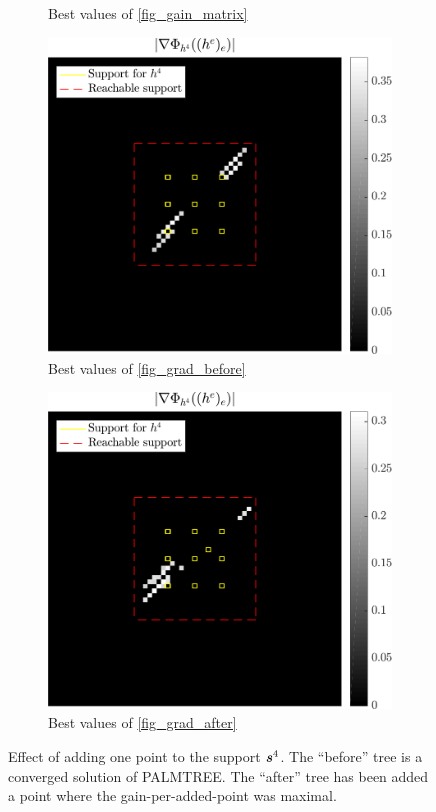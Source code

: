 \begin{figure}[!ht]
\begin{subfigure}[b]{0.32\linewidth}
\caption{Best values of \ref{fig_gain_matrix}}
\end{subfigure}
\begin{subfigure}[b]{0.32\linewidth}\centering
\includegraphics[width=\linewidth]{figures/before_after/xp_128x128_sc2_angl1_K3_S3_node4before_partgrad4_bestvalues.pdf}
\caption{Best values of \ref{fig_grad_before}}
\end{subfigure}
\begin{subfigure}[b]{0.32\linewidth}\centering
\includegraphics[width=\linewidth]{figures/before_after/xp_128x128_sc2_angl1_K3_S3_node4after_partgrad4_bestvalues.pdf}
\caption{Best values of \ref{fig_grad_after}}
\end{subfigure}
\caption{Effect of adding one point to the support $\bm{s}^4$. The “before” tree is a converged solution of \ac{PALMTREE}. The “after” tree has been added a point where the gain-per-added-point was maximal.}\label{fig_before_after_adding}
\end{figure}


